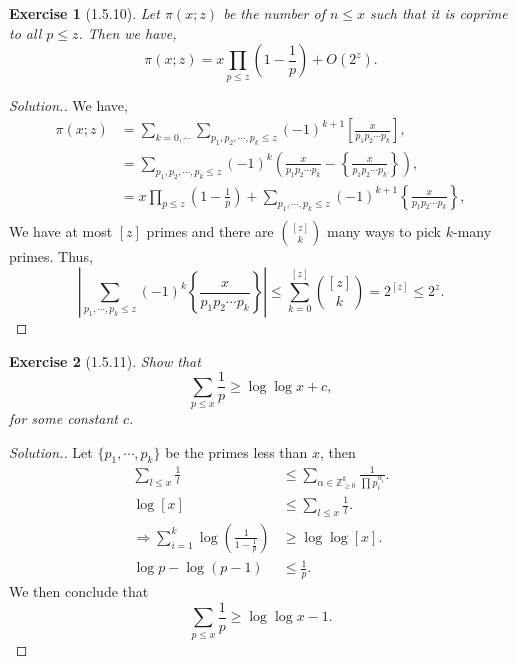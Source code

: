 \documentclass{article}
\newtheorem{exercise}{Exercise}[section]
\newcommand{\Z}[0]{\mathbb{Z}}
\begin{document}
\begin{exercise}[1.5.10]
  Let $\pi(x;z)$ be the number of $n\leq x$ such that it is coprime to all $p\leq z$. Then we have,
  \begin{equation*}
    \pi(x;z)=x\prod_{p\leq z}\left(1-{\frac 1 p}\right)+O(2^z).
  \end{equation*}
\end{exercise}
\begin{proof}[Solution.]
  We have,
  \begin{align*}
    \pi(x;z)&=\sum_{k=0,\cdots}\sum_{p_1,p_2,\cdots,p_k\leq z}(-1)^{k+1}\left[{\frac{x}{p_1p_2\cdots p_k}}\right],\\
    &=\sum_{p_1,p_2,\cdots,p_k\leq z}(-1)^{k}\left({\frac{x}{p_1p_2\cdots p_k}}-\left\{{\frac{x}{p_1p_2\cdots p_k}}\right\}\right),\\
    & = x\prod_{p\leq z}\left(1-{\frac 1 p}\right)+\sum_{p_1,\cdots,p_k\leq z}(-1)^{k+1}\left\{{\frac{x}{p_1p_2\cdots p_k}}\right\},\\
  \end{align*}
  We have at most $[z]$ primes and there are ${[z]\choose k}$ many ways to pick $k$-many primes. Thus,
  \begin{equation*}
    \left\vert\sum_{p_1,\cdots,p_k\leq z}(-1)^k\left\{{\frac{x}{p_1p_2\cdots p_k}}\right\}\right\vert\leq\sum_{k=0}^{[z]}{[z]\choose k} = 2^{[z]}\leq 2^z.
  \end{equation*}
\end{proof}
\begin{exercise}[1.5.11]
  Show that
  \begin{equation*}
    \sum_{p\leq x}{\frac 1 p}\geq \log\log x+c,
  \end{equation*}
  for some constant $c$.
  \label{exercise_1_5_11}
\end{exercise}
\begin{proof}[Solution.]
  Let $\{p_1,\cdots,p_k\}$ be the primes less than $x$, then
  \begin{align*}
    \sum_{l\leq x}{\frac 1 l} & \leq \sum_{\alpha\in\Z_{\geq0}^k}{\frac 1 {\prod p_i^{\alpha_i}}}.\\
    \log [x]&\leq \sum_{l\leq x}{\frac 1 l}.\\
    \Rightarrow \sum_{i=1}^k \log\left({\frac 1 {1-{\frac 1 p}}}\right)&\geq \log\log [x]. \\
    \log p - \log (p-1)&\leq{\frac 1 p}.
  \end{align*}
  We then conclude that 
  \begin{equation*}
    \sum_{p\leq x}{\frac 1 p}\geq \log\log x-1.
  \end{equation*}
\end{proof}
\end{document}
